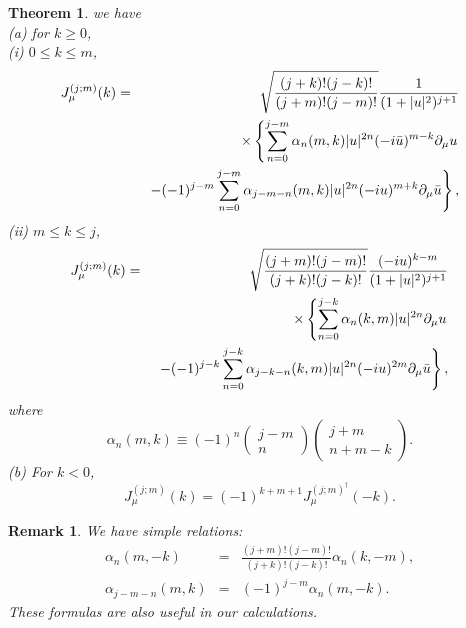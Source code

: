 \documentclass[makeidx,12pt,openany]{report}
\newtheorem{thm}[df]{Theorem}
\newtheorem{rmk}[df]{Remark}
\begin{document}
\begin{thm}\label{thm:1} we have \\
(a) for $k \geq 0$, \\
(i) $0 \leq k \leq m$,
 \begin{eqnarray}
   J_{\mu}^{(j;m)}(k) &=&
    \sqrt{\frac{(j+k)!(j-k)!}{(j+m)!(j-m)!}}
    \frac{1}{(1+|u|^2)^{j+1}} \nonumber\\
  && \hspace{-6mm} \times
   \left\{  
    \sum_{n=0}^{j-m} \alpha _n(m,k) |u|^{2n} (-i\bar{u})^{m-k}\partial_{\mu} u 
   \right. \nonumber\\
  && \hspace{1mm}
   \left.
    -(-1)^{j-m}\sum_{n=0}^{j-m} \alpha _{j-m-n}(m,k) |u|^{2n} (-iu)^{m+k}\partial_{\mu}\bar{u}
   \right\} ,
  \label{eqn:j14} 
 \end{eqnarray}
(ii) $m \leq k \leq j$,
 \begin{eqnarray}
   J_{\mu}^{(j;m)}(k) &=&
    \sqrt{\frac{(j+m)!(j-m)!}{(j+k)!(j-k)!}}
    \frac{(-iu)^{k-m}}{(1+|u|^2)^{j+1}} \nonumber\\
  && \hspace{-6mm} \times
   \left\{  
    \sum_{n=0}^{j-k} \alpha _n(k,m) |u|^{2n} \partial_{\mu} u 
   \right. \nonumber\\
  && \hspace{1mm}
   \left.
   - (-1)^{j-k}
    \sum_{n=0}^{j-k} \alpha _{j-k-n}(k,m) |u|^{2n} (-iu)^{2m} \partial_{\mu}\bar{u}
   \right\} ,
  \label{eqn:j15} 
 \end{eqnarray}
where 
\begin{equation}
 \alpha _n(m,k) \equiv
   (-1)^n
    \left(
     \begin{array}{c}
      j-m \\
       n  
     \end{array}
    \right)
    \left(
     \begin{array}{c}
       j+m \\
       n+m-k  
     \end{array}
    \right) .
 \label{eqn:j16}
\end{equation}
(b) For $k < 0$,
\begin{equation}
  J_{\mu}^{(j;m)}(k)=(-1)^{k+m+1} J_{\mu}^{(j;m)^{\dag}}(-k). 
 \label{eqn:j17}
\end{equation}
\end{thm}
\begin{rmk}
We have simple relations:
\begin{eqnarray}
 \alpha_n(m,-k) &=& \frac{(j+m)!(j-m)!}{(j+k)!(j-k)!} \alpha_n(k,-m),\\
 \alpha_{j-m-n}(m,k) &=& (-1)^{j-m} \alpha_n(m,-k).
\end{eqnarray}
These formulas are also useful in our calculations.
\end{rmk}
\end{document}
